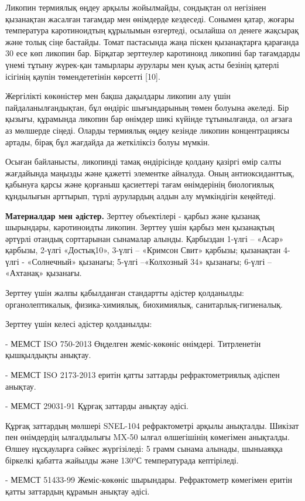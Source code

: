 \begin{multicols}{2}
Ликопин термиялық өңдеу арқылы жойылмайды, сондықтан ол негізінен
қызанақтан жасалған тағамдар мен өнімдерде кездеседі. Сонымен қатар,
жоғары температура каротиноидтың құрылымын өзгертеді, осылайша ол денеге
жақсырақ және толық сіңе бастайды. Томат пастасында жаңа піскен
қызанақтарға қарағанда 30 есе көп ликопин бар. Бірқатар зерттеулер
каротиноид ликопині бар тағамдарды үнемі тұтыну жүрек-қан тамырлары
аурулары мен қуық асты безінің қатерлі ісігінің қаупін төмендететінін
көрсетті {[}10{]}.

Жергілікті көкөністер мен бақша дақылдары ликопин алу үшін
пайдаланылғандықтан, бұл өндіріс шығындарының төмен болуына әкеледі. Бір
қызығы, құрамында ликопин бар өнімдер шикі күйінде тұтынылғанда, ол
ағзаға аз мөлшерде сіңеді. Оларды термиялық өңдеу кезінде ликопин
концентрациясы артады, бірақ бұл жағдайда да жеткіліксіз болуы мүмкін.

Осыған байланысты, ликопинді тамақ өндірісінде қолдану қазіргі өмір
салты жағдайында маңызды және қажетті элементке айналуда. Оның
антиоксиданттық, қабынуға қарсы және қорғаныш қасиеттері тағам
өнімдерінің биологиялық құндылығын арттырып, түрлі аурулардың алдын алу
мүмкіндігін кеңейтеді.

{\bfseries Материалдар мен әдістер.} Зерттеу объектілері - қарбыз және
қызанақ шырындары, каротиноидты ликопин. Зерттеу үшін қарбыз мен
қызанақтың әртүрлі отандық сорттарынан сынамалар алынды. Қарбыздан
1-үлгі -- «Асар» қарбызы, 2-үлгі «Достық10», 3-үлгі -- «Кримсон Свит»
қарбызы; қызанақтан 4-үлгі - «Солнечный» қызанағы; 5-үлгі --«Колхозный
34» қызанағы; 6-үлгі -- «Ахтанақ» қызанағы.

Зерттеу үшін жалпы қабылданған стандартты әдістер қолданылды:
органолептикалық, физика-химиялық, биохимиялық, санитарлық-гигиеналық.

Зерттеу үшін келесі әдістер қолданылды:

- МЕМСТ ISO 750-2013 Өңделген жеміс-көкөніс өнімдері. Титрленетін
қышқылдықты анықтау.

- МЕМСТ ISO 2173-2013 еритін қатты заттарды рефрактометриялық әдіспен
анықтау.

- МЕМСТ 29031-91 Құрғақ заттарды анықтау әдісі.

Құрғақ заттардың мөлшері SNEL-104 рефрактометрі арқылы анықталды.
Шикізат пен өнімдердің ылғалдылығы MX-50 ылғал өлшегішінің көмегімен
анықталды. Өлшеу нұсқауларға сәйкес жүргізіледі: 5 грамм сынама алынады,
шыныаяққа біркелкі қабатта жайылды және 130°С температурада кептіріледі.

- МЕМСТ 51433-99 Жеміс-көкөніс шырындары. Рефрактометр көмегімен еритін
қатты заттардың құрамын анықтау әдісі.


\end{multicols}
